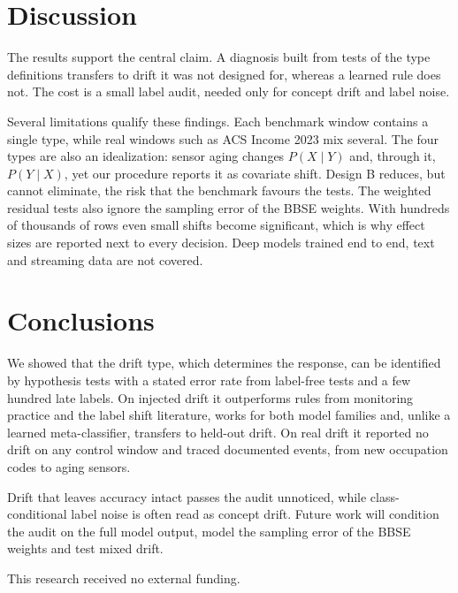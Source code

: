 \documentclass[10pt]{article}
\begin{document}
\section{Discussion}
\label{sec:discussion}

The results support the central claim. A diagnosis built from tests of the type definitions transfers to drift it was not designed for, whereas a learned rule does not. The cost is a small label audit, needed only for concept drift and label noise.

Several limitations qualify these findings. Each benchmark window contains a single type, while real windows such as ACS Income 2023 mix several. The four types are also an idealization: sensor aging changes $P(X\mid Y)$ and, through it, $P(Y\mid X)$, yet our procedure reports it as covariate shift. Design B reduces, but cannot eliminate, the risk that the benchmark favours the tests. The weighted residual tests also ignore the sampling error of the BBSE weights. With hundreds of thousands of rows even small shifts become significant, which is why effect sizes are reported next to every decision. Deep models trained end to end, text and streaming data are not covered.

\section{Conclusions}
\label{sec:conclusion}

We showed that the drift type, which determines the response, can be identified by hypothesis tests with a stated error rate from label-free tests and a few hundred late labels. On injected drift it outperforms rules from monitoring practice and the label shift literature, works for both model families and, unlike a learned meta-classifier, transfers to held-out drift. On real drift it reported no drift on any control window and traced documented events, from new occupation codes to aging sensors.

Drift that leaves accuracy intact passes the audit unnoticed, while class-conditional label noise is often read as concept drift. Future work will condition the audit on the full model output, model the sampling error of the BBSE weights and test mixed drift.

\begin{acknowledgements}
This research received no external funding.
\end{acknowledgements}




\end{document}
